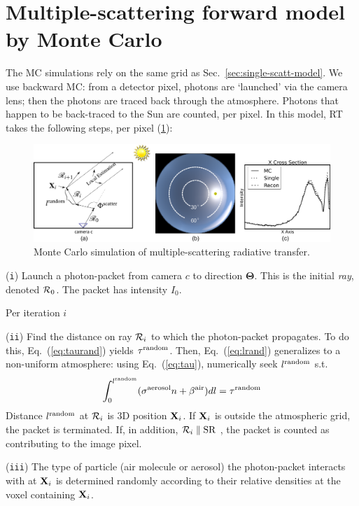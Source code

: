 \documentclass[10pt,letterpaper]{article}
\newcommand{\yoavcomment}[1]{}
\renewcommand{\yoavcomment}[1]{#1} %
\begin{document}
\section{Multiple-scattering forward model by Monte Carlo}
\label{sec:monte-carlo-simul}


The MC simulations rely on the same grid as
Sec.~\ref{sec:single-scatt-model}. We use backward MC: from a detector
pixel, photons are `launched' via the camera lens; then the photons
are traced back through the atmosphere. Photons that happen to be
back-traced to the Sun are counted, per pixel. In this model, RT takes
the following steps, per pixel (\cref{fig:mcgrid}):
\begin{figure}
  \centering
  \yoavcomment{\includegraphics[width=0.5\linewidth]{images/mcgrid.pdf}}
  \caption{\small Monte Carlo simulation of multiple-scattering
    radiative transfer.}
  \label{fig:mcgrid}
\end{figure}

\noindent ({\tt i}) Launch a photon-packet from camera $c$ to
direction ${\bm{\Theta}}$. This is the initial {\em ray}, denoted
${\cal R}_0$. The packet has intensity $I_0$.

\noindent Per iteration $i$

\noindent ({\tt ii}) Find the distance on ray ${\cal R}_{i}$ to which
the photon-packet propagates. To do this, Eq.~(\ref{eq:taurand})
yields $\tau^{\rm random}$. Then, Eq.~(\ref{eq:lrand}) generalizes to
a non-uniform atmosphere: using Eq.~(\ref{eq:tau}), numerically seek
$l^{\rm random}$ s.t.
\begin{align}
  \int_0^{l^{\rm random}}(\sigma^{\rm aerosol} n +\beta^{\rm air}) dl
  = \tau^{\rm random}
  \label{eq:MCextinct}
\end{align}
Distance $l^{\rm random}$ at ${\cal R}_{i}$ is 3D position ${\bf
  X}_{i}$.  If ${\bf X}_{i}$ is outside the atmospheric grid, the
packet is terminated. If, in addition, ${\cal R}_{i}\parallel {\rm
  SR}$ , the packet is counted as contributing to the image pixel.

\noindent ({\tt iii}) The type of particle (air molecule or aerosol)
the photon-packet interacts with at ${\bf X}_{i}$ is determined
randomly according to their relative densities at the voxel containing
${\bf X}_{i}$.
\end{document}

